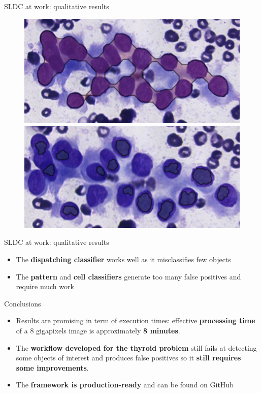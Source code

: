 \documentclass{beamer}
\begin{document}
\begin{frame}{SLDC at work: qualitative results}
\begin{figure}
		\includegraphics[scale=0.25]{images/failure_reseg_noreason_1_pat.png}
		\hspace{0.25cm}
		\includegraphics[scale=0.25]{images/failure_reseg_noreason_1_nopat.png}
	\end{figure}
\end{frame}


\begin{frame}{SLDC at work: qualitative results}
	\begin{itemize}
		\item The \textbf{dispatching classifier} works well as it misclassifies few objects
		\item The \textbf{pattern} and \textbf{cell classifiers} generate too many false positives and require much work
	\end{itemize}
\end{frame}

\begin{frame}{Conclusions}
	\begin{itemize}
		\item Results are promising in term of execution times: effective \textbf{processing time} of a 8 gigapixels image is approximately \textbf{8 minutes}.
		\item The \textbf{workflow developed for the thyroid problem} still fails at detecting some objects of interest and produces false positives so it \textbf{still requires some improvements}.
		\item The \textbf{framework is production-ready} and can be found on GitHub
	\end{itemize}
\end{frame}
\end{document}

